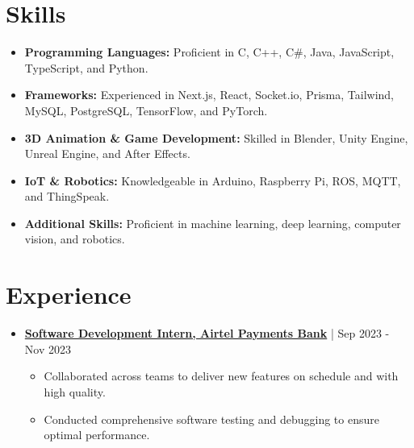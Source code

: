 \documentclass[a4paper,10pt]{article} %
\newcommand{\sectionbreak}{\vspace{0cm}} %
\newcommand{\subsectionbreak}{\vspace{0cm}} %
\begin{document}
\section{Skills}
\begin{itemize}[noitemsep, topsep=0pt]
    \item \textbf{Programming Languages:} Proficient in C, C++, C\#, Java, JavaScript, TypeScript, and Python.
    \item \textbf{Frameworks:} Experienced in Next.js, React, Socket.io, Prisma, Tailwind, MySQL, PostgreSQL, TensorFlow, and PyTorch.
    \item \textbf{3D Animation \& Game Development:} Skilled in Blender, Unity Engine, Unreal Engine, and After Effects.
    \item \textbf{IoT \& Robotics:} Knowledgeable in Arduino, Raspberry Pi, ROS, MQTT, and ThingSpeak.
    \item \textbf{Additional Skills:} Proficient in machine learning, deep learning, computer vision, and robotics.
\end{itemize}
\sectionbreak

\section{Experience}
\begin{itemize}[noitemsep, topsep=0pt]
    \item \href{https://drive.google.com/file/d/1zCj8CKZbHcKEj6LS8N3VzG33aIENUIZA/view?usp=sharing}{\textcolor{accentcolor}{\textbf{
Software Development Intern, Airtel Payments Bank}}} | Sep 2023 - Nov 2023
        \subsectionbreak
        \begin{itemize}
            \item Collaborated across teams to deliver new features on schedule and with high quality.
            \item Conducted comprehensive software testing and debugging to ensure optimal performance.
        \end{itemize}
        \subsectionbreak
\end{itemize}

\sectionbreak

\end{document}
